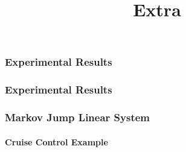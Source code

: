 \title[PhD Defence]{%
    {\Huge Extra}
}
\author[Nils Vreman]{}
\date[]{}
\notitlelogo{}

\begin{frame}
    \begin{figure}
        \only<2>{}%
        \only<3>{}%
    \end{figure}
\end{frame}


\begin{frame}
    \frametitle{Experimental Results}
    \begin{figure}[h]
        \centering
        \resizebox{0.85\textwidth}{!}{}
    \end{figure}
\end{frame}


\begin{frame}
    \frametitle{Experimental Results}
    \begin{figure}[h]
        \centering
        \resizebox{0.9\textwidth}{!}{}
    \end{figure}
    \hspace{2.3cm}
\end{frame}


\begin{frame}
    \frametitle{Markov Jump Linear System}%
    \framesubtitle{Cruise Control Example}
    \begin{figure}
        \centering
        
    \end{figure}
\end{frame}
